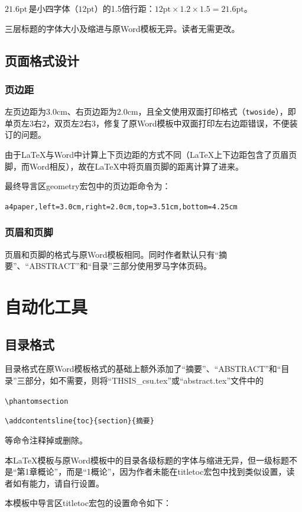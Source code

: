 $21.6\mathrm{pt}$\,是小四字体（$12\mathrm{pt}$）的1.5倍行距：$12\mathrm{pt}\times 1.2\times 1.5 = 21.6\mathrm{pt}$。

三层标题的字体大小及缩进与原Word模板无异。读者无需更改。

\subsection{页面格式设计}
\subsubsection{页边距}
左页边距为$3.0\mathrm{cm}$、右页边距为$2.0\mathrm{cm}$，且全文使用双面打印格式（\verb"twoside"），即单页左3右2，双页左2右3，修复了原Word模板中双面打印左右边距错误，不便装订的问题。

由于\LaTeX 与Word中计算上下页边距的方式不同（\LaTeX 上下边距包含了页眉页脚，而Word相反），故在\LaTeX 中将页眉页脚的距离计算了进来。

最终导言区geometry宏包中的页边距命令为：

\verb"a4paper,left=3.0cm,right=2.0cm,top=3.51cm,bottom=4.25cm"

\subsubsection{页眉和页脚}
页眉和页脚的格式与原Word模板相同。同时作者默认只有“摘要”、“ABSTRACT”和“目录”三部分使用罗马字体页码。

\newpage\vspace*{-21.6pt}
\section{自动化工具}
\subsection{目录格式}
目录格式在原Word模板格式的基础上额外添加了“摘要”、“ABSTRACT”和“目录”三部分，如不需要，则将“THSIS\_csu.tex”或“abstract.tex”文件中的

\verb"\phantomsection"

\verb"\addcontentsline{toc}{section}{摘要}"

等命令注释掉或删除。

本\LaTeX 模板与原Word模板中的目录各级标题的字体与缩进无异，但一级标题不是“第1章\quad 概论”，而是“1\quad 概论”，因为作者未能在titletoc宏包中找到类似设置，读者如有能力，请自行设置。

本模板中导言区titletoc宏包的设置命令如下：

